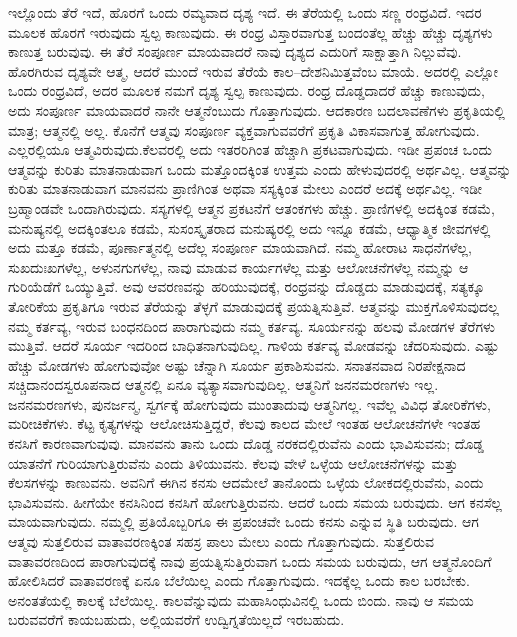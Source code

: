 ಇಲ್ಲೊಂದು ತೆರೆ ಇದೆ, ಹೊರಗೆ ಒಂದು ರಮ್ಯವಾದ ದೃಶ್ಯ ಇದೆ. ಈ ತೆರೆಯಲ್ಲಿ ಒಂದು ಸಣ್ಣ ರಂಧ್ರವಿದೆ. ಇದರ ಮೂಲಕ ಹೊರಗೆ ಇರುವುದು ಸ್ವಲ್ಪ ಕಾಣುವುದು. ಈ ರಂಧ್ರ ವಿಸ್ತಾರವಾಗುತ್ತ ಬಂದಂತೆಲ್ಲ ಹೆಚ್ಚು ಹೆಚ್ಚು ದೃಶ್ಯಗಳು ಕಾಣುತ್ತ ಬರುವುವು. ಈ ತೆರೆ ಸಂಪೂರ್ಣ ಮಾಯವಾದರೆ ನಾವು ದೃಶ್ಯದ ಎದುರಿಗೆ ಸಾಕ್ಷಾತ್ತಾಗಿ ನಿಲ್ಲುವೆವು. ಹೊರಗಿರುವ ದೃಶ್ಯವೇ ಆತ್ಮ, ಆದರೆ ಮುಂದೆ ಇರುವ ತೆರೆಯೆ ಕಾಲ–ದೇಶನಿಮಿತ್ತವೆಂಬ ಮಾಯೆ. ಅದರಲ್ಲಿ ಎಲ್ಲೋ ಒಂದು ರಂಧ್ರವಿದೆ, ಅದರ ಮೂಲಕ ನಮಗೆ ದೃಶ್ಯ ಸ್ವಲ್ಪ ಕಾಣುವುದು. ರಂಧ್ರ ದೊಡ್ಡದಾದರೆ ಹೆಚ್ಚು ಕಾಣುವುದು, ಅದು ಸಂಪೂರ್ಣ ಮಾಯವಾದರೆ ನಾನೇ ಆತ್ಮನೆಂಬುದು ಗೊತ್ತಾಗುವುದು. ಆದಕಾರಣ ಬದಲಾವಣೆಗಳು ಪ್ರಕೃತಿಯಲ್ಲಿ ಮಾತ್ರ; ಆತ್ಮನಲ್ಲಿ ಅಲ್ಲ. ಕೊನೆಗೆ ಆತ್ಮವು ಸಂಪೂರ್ಣ ವ್ಯಕ್ತವಾಗುವವರೆಗೆ ಪ್ರಕೃತಿ ವಿಕಾಸವಾಗುತ್ತ ಹೋಗುವುದು. ಎಲ್ಲರಲ್ಲಿಯೂ ಆತ್ಮವಿರುವುದು.\break ಕೆಲವರಲ್ಲಿ ಅದು ಇತರರಿಗಿಂತ ಹೆಚ್ಚಾಗಿ ಪ್ರಕಟವಾಗುವುದು. ಇಡೀ ಪ್ರಪಂಚ ಒಂದು ಆತ್ಮವನ್ನು ಕುರಿತು ಮಾತನಾಡುವಾಗ ಒಂದು ಮತ್ತೊಂದಕ್ಕಿಂತ ಉತ್ತಮ ಎಂದು ಹೇಳುವುದರಲ್ಲಿ ಅರ್ಥವಿಲ್ಲ. ಆತ್ಮವನ್ನು ಕುರಿತು ಮಾತನಾಡುವಾಗ ಮಾನವನು ಪ್ರಾಣಿಗಿಂತ ಅಥವಾ ಸಸ್ಯಕ್ಕಿಂತ ಮೇಲು ಎಂದರೆ ಅದಕ್ಕೆ ಅರ್ಥವಿಲ್ಲ. ಇಡೀ ಬ್ರಹ್ಮಾಂಡವೇ ಒಂದಾಗಿರುವುದು. ಸಸ್ಯಗಳಲ್ಲಿ ಆತ್ಮನ ಪ್ರಕಟನೆಗೆ ಆತಂಕಗಳು ಹೆಚ್ಚು. ಪ್ರಾಣಿಗಳಲ್ಲಿ ಅದಕ್ಕಿಂತ ಕಡಮೆ, ಮನುಷ್ಯನಲ್ಲಿ ಅದಕ್ಕಿಂತಲೂ ಕಡಮೆ, ಸುಸಂಸ್ಕೃತರಾದ ಮನುಷ್ಯರಲ್ಲಿ ಅದು ಇನ್ನೂ ಕಡಮೆ, ಆಧ್ಯಾತ್ಮಿಕ ಜೀವಗಳಲ್ಲಿ ಅದು ಮತ್ತೂ ಕಡಮೆ, ಪೂರ್ಣಾತ್ಮನಲ್ಲಿ ಅದೆಲ್ಲ ಸಂಪೂರ್ಣ ಮಾಯವಾಗಿದೆ. ನಮ್ಮ ಹೋರಾಟ ಸಾಧನೆಗಳೆಲ್ಲ, ಸುಖದುಃಖಗಳೆಲ್ಲ, ಅಳುನಗುಗಳೆಲ್ಲ, ನಾವು ಮಾಡುವ ಕಾರ್ಯಗಳೆಲ್ಲ ಮತ್ತು ಆಲೋಚನೆಗಳೆಲ್ಲ ನಮ್ಮನ್ನು ಆ ಗುರಿಯೆಡೆಗೆ ಒಯ್ಯುತ್ತಿವೆ. ಅವು ಆವರಣವನ್ನು ಹರಿಯುವುದಕ್ಕೆ, ರಂಧ್ರವನ್ನು ದೊಡ್ಡದು ಮಾಡುವುದಕ್ಕೆ, ಸತ್ಯಕ್ಕೂ ತೋರಿಕೆಯ ಪ್ರಕೃತಿಗೂ ಇರುವ ತೆರೆಯನ್ನು ತೆಳ್ಳಗೆ ಮಾಡುವುದಕ್ಕೆ ಪ್ರಯತ್ನಿಸುತ್ತಿವೆ. ಆತ್ಮವನ್ನು ಮುಕ್ತಗೊಳಿಸುವುದಲ್ಲ ನಮ್ಮ ಕರ್ತವ್ಯ, ಇರುವ ಬಂಧನದಿಂದ ಪಾರಾಗುವುದು ನಮ್ಮ ಕರ್ತವ್ಯ. ಸೂರ್ಯನನ್ನು ಹಲವು ಮೋಡಗಳ ತೆರೆಗಳು ಮುತ್ತಿವೆ. ಆದರೆ ಸೂರ್ಯ ಇದರಿಂದ ಬಾಧಿತನಾಗುವುದಿಲ್ಲ. ಗಾಳಿಯ ಕರ್ತವ್ಯ ಮೋಡವನ್ನು ಚೆದರಿಸುವುದು. ಎಷ್ಟು ಹೆಚ್ಚು ಮೋಡಗಳು ಹೋಗುವುವೋ ಅಷ್ಟು ಚೆನ್ನಾಗಿ ಸೂರ್ಯ ಪ್ರಕಾಶಿಸುವನು. ಸನಾತನವಾದ ನಿರಪೇಕ್ಷನಾದ ಸಚ್ಚಿದಾನಂದಸ್ವರೂಪನಾದ ಆತ್ಮನಲ್ಲಿ ಏನೂ ವ್ಯತ್ಯಾಸವಾಗುವುದಿಲ್ಲ. ಆತ್ಮನಿಗೆ ಜನನಮರಣಗಳು ಇಲ್ಲ. ಜನನಮರಣಗಳು, ಪುನರ್ಜನ್ಮ, ಸ್ವರ್ಗಕ್ಕೆ ಹೋಗುವುದು ಮುಂತಾದುವು ಆತ್ಮನಿಗಲ್ಲ. ಇವೆಲ್ಲ ವಿವಿಧ ತೋರಿಕೆಗಳು, ಮರೀಚಿಕೆಗಳು. ಕೆಟ್ಟ ಕೃತ್ಯಗಳನ್ನು ಆಲೋಚಿಸುತ್ತಿದ್ದರೆ, ಕೆಲವು ಕಾಲದ ಮೇಲೆ ಇಂತಹ ಆಲೋಚನೆಗಳೇ ಇಂತಹ ಕನಸಿಗೆ ಕಾರಣವಾಗುವುವು. ಮಾನವನು ತಾನು ಒಂದು ದೊಡ್ಡ ನರಕದಲ್ಲಿರುವೆನು ಎಂದು ಭಾವಿಸುವನು; ದೊಡ್ಡ ಯಾತನೆಗೆ ಗುರಿಯಾಗುತ್ತಿರುವೆನು ಎಂದು ತಿಳಿಯುವನು. ಕೆಲವು ವೇಳೆ ಒಳ್ಳೆಯ ಆಲೋಚನೆಗಳನ್ನು ಮತ್ತು ಕೆಲಸಗಳನ್ನು ಕಾಣುವನು. ಅವನಿಗೆ ಈಗಿನ ಕನಸು ಆದಮೇಲೆ ತಾನೊಂದು ಒಳ್ಳೆಯ ಲೋಕದಲ್ಲಿರುವೆನು, ಎಂದು ಭಾವಿಸುವನು. ಹೀಗೆಯೇ ಕನಸಿನಿಂದ ಕನಸಿಗೆ ಹೋಗುತ್ತಿರುವನು. ಆದರೆ ಒಂದು ಸಮಯ ಬರುವುದು. ಆಗ ಕನಸೆಲ್ಲ ಮಾಯವಾಗುವುದು. ನಮ್ಮಲ್ಲಿ ಪ್ರತಿಯೊಬ್ಬರಿಗೂ ಈ ಪ್ರಪಂಚವೇ ಒಂದು ಕನಸು ಎನ್ನುವ ಸ್ಥಿತಿ ಬರುವುದು. ಆಗ ಆತ್ಮವು ಸುತ್ತಲಿರುವ ವಾತಾವರಣಕ್ಕಿಂತ ಸಹಸ್ರ ಪಾಲು ಮೇಲು ಎಂದು ಗೊತ್ತಾಗುವುದು. ಸುತ್ತಲಿರುವ ವಾತಾವರಣದಿಂದ ಪಾರಾಗುವುದಕ್ಕೆ ನಾವು ಪ್ರಯತ್ನಿಸುತ್ತಿರುವಾಗ ಒಂದು ಸಮಯ ಬರುವುದು, ಆಗ ಆತ್ಮನೊಂದಿಗೆ ಹೋಲಿಸಿದರೆ ವಾತಾವರಣಕ್ಕೆ ಏನೂ ಬೆಲೆಯಿಲ್ಲ ಎಂದು ಗೊತ್ತಾಗುವುದು. ಇದಕ್ಕೆಲ್ಲ ಒಂದು ಕಾಲ ಬರಬೇಕು. ಅನಂತತೆಯಲ್ಲಿ ಕಾಲಕ್ಕೆ ಬೆಲೆಯಿಲ್ಲ. ಕಾಲವೆನ್ನುವುದು ಮಹಾಸಿಂಧುವಿನಲ್ಲಿ ಒಂದು ಬಿಂದು. ನಾವು ಆ ಸಮಯ ಬರುವವರೆಗೆ ಕಾಯಬಹುದು, ಅಲ್ಲಿಯವರೆಗೆ ಉದ್ವಿಗ್ನತೆಯಿಲ್ಲದೆ ಇರಬಹುದು.

